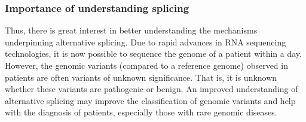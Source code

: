 
\subsubsection{Importance of understanding splicing}
Thus, there is great interest in better understanding the mechanisms underpinning alternative splicing. Due to rapid advances in RNA sequencing technologies, it is now possible to sequence the genome of a patient within a day. However, the genomic variants (compared to a reference genome) observed in patients are often variants of unknown significance. \cite{bretschneiderphdthesis} That is, it is unknown whether these variants are pathogenic or benign. An improved understanding of alternative splicing may improve the classification of genomic variants and help with the diagnosis of patients, especially those with rare genomic diseases.
